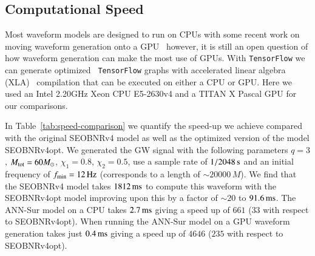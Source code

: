 \documentclass[aps,prd,reprint,superscriptaddress,preprintnumbers,showpacs,nofootinbib]{revtex4-1}
\begin{document}
\subsection{Computational Speed}
\label{subsec:speed}

Most waveform models are designed to run on CPUs with some recent work on moving
waveform generation onto a
GPU~\cite{Chua2020LearningBP,Katz2020GPUacceleratedMB,Talbot2019ParallelizedIF,2020arXiv200806071C}
however, it is still an open question of how waveform generation can make the
most use of GPUs. With {\tt TensorFlow} we can generate optimized {\tt
TensorFlow} graphs with accelerated linear algebra (XLA)~\cite{xla} compilation
that can be executed on either a CPU or GPU. Here we used an Intel 2.20GHz Xeon
CPU E5-2630v4 and a TITAN X Pascal GPU for our comparisons.

In Table~\ref{tab:speed-comparison} we quantify the speed-up we achieve compared
with the original SEOBNRv4 model as well as the optimized version of the model
SEOBNRv4opt. We generated the GW signal with the following parameters $q=3$,
$M_{\rm{tot}}=60 M_\odot$, $\chi_{1} = 0.8$, $\chi_{2} = 0.5$, use a sample rate
of $1/2048 \, {\rm{s}}$ and an initial frequency of $f_{\rm{min}} = 12 \,
{\rm{Hz}}$ (corresponds to a length of $\sim 20000 \, M$). We find that the
SEOBNRv4 model takes $1812 \, {\rm{ms}}$ to compute this waveform with the
SEOBNRv4opt model improving upon this by a factor of $\sim 20$ to $91.6 \,
{\rm{ms}}$. The ANN-Sur model on a CPU takes $2.7 \, {\rm{ms}}$ giving a speed
up of $661$ ($33$ with respect to SEOBNRv4opt). When running the ANN-Sur model
on a GPU waveform generation takes just $0.4 \, {\rm{ms}}$ giving a speed up of
$4646$ ($235$ with respect to SEOBNRv4opt).
\end{document}
